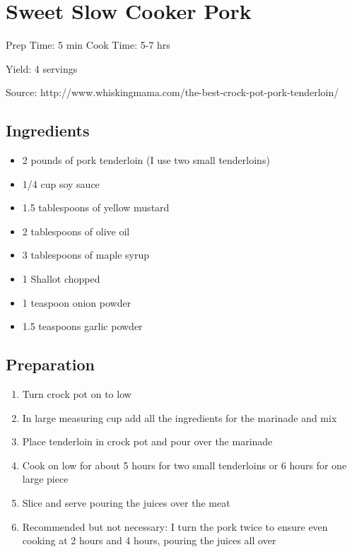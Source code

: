 \section{Sweet Slow Cooker Pork}

\begin{center}
Prep Time: 5 min
Cook Time: 5-7 hrs

\noindent Yield: 4 servings

\vspace{1em}

Source: http://www.whiskingmama.com/the-best-crock-pot-pork-tenderloin/
\end{center}

\subsection{Ingredients}
\begin{multicols}{2}
\begin{itemize}
    \item 2 pounds of pork tenderloin (I use two small tenderloins)
    \item 1/4 cup soy sauce
    \item 1.5 tablespoons of yellow mustard
    \item 2 tablespoons of olive oil
    \item 3 tablespoons of maple syrup
    \item 1 Shallot chopped
    \item 1 teaspoon onion powder
    \item 1.5 teaspoons garlic powder
\end{itemize}
\end{multicols}

\subsection{Preparation}
\begin{enumerate}
    \item Turn crock pot on to low
    \item In large measuring cup add all the ingredients for the marinade and mix
    \item Place tenderloin in crock pot and pour over the marinade
    \item Cook on low for about 5 hours for two small tenderloins or 6 hours for one large piece
    \item Slice and serve pouring the juices over the meat
    \item Recommended but not necessary: I turn the pork twice to ensure even cooking at 2 hours and 4 hours, pouring the juices all over
\end{enumerate}

